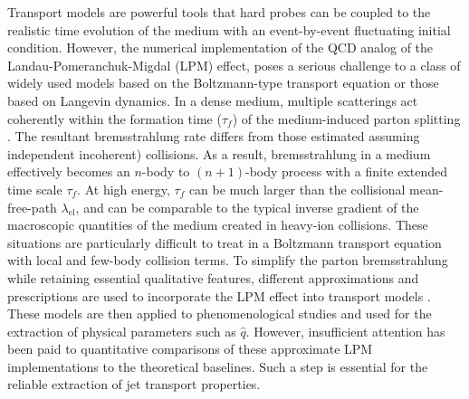 \documentclass[aps, prc, reprint, amsmath, groupedaddress, nofootinbib]{revtex4-1}
\begin{document}
Transport models are powerful tools that hard probes can be coupled to the realistic time evolution of the medium with an event-by-event fluctuating initial condition. 
However, the numerical implementation of the QCD analog of the Landau-Pomeranchuk-Migdal (LPM) effect, poses a serious challenge to a class of widely used models based on the Boltzmann-type transport equation or those based on Langevin dynamics.
In a dense medium, multiple scatterings act coherently within the formation time ($\tau_f$) of the medium-induced parton splitting \cite{PhysRev.103.1811,Wang:1994fx,Zakharov:1996fv,Zakharov:1997uu,Baier:1996kr,Baier:1996sk}.
The resultant bremsstrahlung rate differs from those estimated assuming independent incoherent) collisions.
As a result, bremsstrahlung in a medium effectively becomes an $n$-body to $(n+1)$-body process with a finite extended time scale $\tau_f$. At high energy, $\tau_f$ can be much larger than the collisional mean-free-path $\lambda_{\textrm{el}}$, and can be comparable to the typical inverse gradient of the macroscopic quantities of the medium created in heavy-ion collisions.
These situations are particularly difficult to treat in a Boltzmann transport equation with local and few-body collision terms. 
To simplify the parton bremsstrahlung while retaining essential qualitative features, different approximations and prescriptions are used to incorporate the LPM effect into transport models \cite{Cao:2013ita,ColemanSmith:2012vr,Xu:2004mz,Zapp:2011ya,Gossiaux:2012cv,Park:thesis}.
These models are then applied to phenomenological studies and used for the extraction of physical parameters such as $\hat{q}$.
However, insufficient attention has been paid to quantitative comparisons of these approximate LPM implementations to the theoretical baselines.
Such a step is essential for the reliable extraction of jet transport properties.
\end{document}
